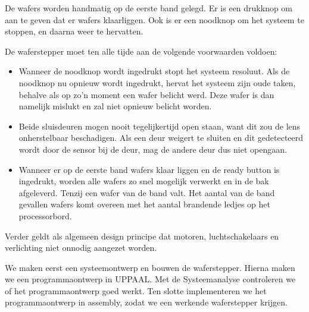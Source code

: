 De wafers worden handmatig op de eerste band gelegd. Er is een
drukknop om aan te geven dat er wafers klaarliggen. Ook is er een
noodknop om het systeem te stoppen, en daarna weer te hervatten.

De waferstepper moet ten alle tijde aan de volgende voorwaarden
voldoen:
\begin{itemize}
  \item Wanneer de noodknop wordt ingedrukt stopt het systeem
  resoluut. Als de noodknop nu opnieuw wordt ingedrukt, hervat het
  systeem zijn oude taken, behalve als op zo'n moment een wafer belicht werd.
  Deze wafer is dan namelijk mislukt en zal niet opnieuw belicht worden.
  \item Beide sluisdeuren mogen nooit tegelijkertijd open staan,
  want dit zou de lens onherstelbaar beschadigen. Als een deur
  weigert te sluiten en dit gedetecteerd wordt door de sensor bij de
  deur, mag de andere deur dus niet opengaan.
  \item Wanneer er op de eerste band wafers klaar liggen en de ready
  button is ingedrukt, worden alle wafers zo snel mogelijk verwerkt en in de bak
  afgeleverd. Tenzij een wafer van de band valt. Het aantal van de band
  gevallen wafers komt overeen met het aantal brandende ledjes op het processorbord.
\end{itemize}
Verder geldt als algemeen design principe dat motoren,
luchtschakelaars en verlichting niet onnodig aangezet worden.

We maken eerst een systeemontwerp en bouwen de waferstepper. Hierna
maken we een programmaontwerp in UPPAAL. Met de Systeemanalyse
controleren we of het programmaontwerp goed werkt. Ten slotte
implementeren we het programmaontwerp in assembly, zodat we een
werkende waferstepper krijgen.
